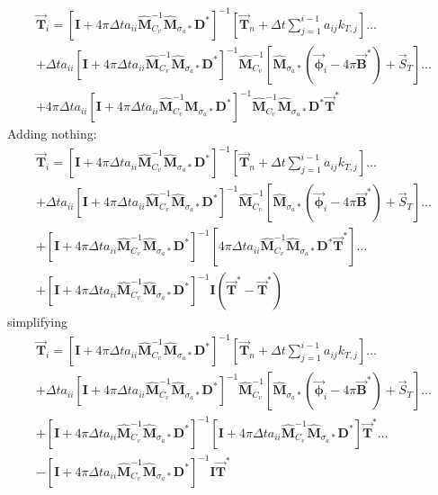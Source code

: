 \documentclass[11pt]{article}
\newcommand{\vect}[1]{\ensuremath{ \vec{\mathbf #1}}}
\newcommand{\Mw}{\ensuremath{\widehat{\mathbf M}}}
\begin{document}
%
%
%
\begin{multline*}
\vect{T}_i = \left[\mathbf{I} +4\pi\Delta t a_{ii}\Mw_{C_v}^{-1}\Mw_{\sigma_a*}\mathbf{D}^*  \right]^{-1}\left[\vect{T}_n + \Delta t \sum_{j=1}^{i-1}{a_{ij} k_{T,j}   }\right] \dots \\
+ \Delta t a_{ii}\left[\mathbf{I} +4\pi\Delta t a_{ii}\Mw_{C_v}^{-1}\Mw_{\sigma_a*}\mathbf{D}^*  \right]^{-1}
\Mw_{C_v}^{-1}\left[ \Mw_{\sigma_a*}\left(\vect{\phi}_i - 4\pi\vect{B}^*\right)  + \vec{S}_T \right]\dots \\
+4\pi\Delta t a_{ii}\left[\mathbf{I} + 4\pi\Delta t a_{ii}\Mw_{C_v}^{-1}\Mw_{\sigma_a*}\mathbf{D}^*  \right]^{-1}
\Mw_{C_v}^{-1}\Mw_{\sigma_a*}\mathbf{D}^*\vect{T}^*
\end{multline*}
%
%
Adding nothing:
\begin{multline*}
\vect{T}_i = \left[\mathbf{I} + 4\pi\Delta t a_{ii}\Mw_{C_v}^{-1}\Mw_{\sigma_a*}\mathbf{D}^*  \right]^{-1}\left[\vect{T}_n + \Delta t \sum_{j=1}^{i-1}{a_{ij} k_{T,j}   }\right] \dots \\
+ \Delta t a_{ii}\left[\mathbf{I} + 4\pi\Delta t a_{ii}\Mw_{C_v}^{-1}\Mw_{\sigma_a*}\mathbf{D}^*  \right]^{-1}
\Mw_{C_v}^{-1}\left[\Mw_{\sigma_a*} \left(\vect{\phi}_i -  4\pi\vect{B}^*\right) + \vec{S}_T \right]\dots \\
+\left[\mathbf{I} + 4\pi\Delta t a_{ii}\Mw_{C_v}^{-1}\Mw_{\sigma_a*}\mathbf{D}^*  \right]^{-1}
\left[ 4\pi\Delta t a_{ii} \Mw_{C_v}^{-1}\Mw_{\sigma_a*}  \mathbf{D}^*\vect{T}^* \right]\dots \\
+ \left[\mathbf{I} + 4\pi\Delta t a_{ii}\Mw_{C_v}^{-1}\Mw_{\sigma_a*}\mathbf{D}^*  \right]^{-1} \mathbf{I}\left( \vect{T}^* - \vect{T}^*\right)
\end{multline*}
%
%
simplifying
\begin{multline*}
\vect{T}_i = \left[\mathbf{I} + 4\pi\Delta t a_{ii}\Mw_{C_v}^{-1}\Mw_{\sigma_a*}\mathbf{D}^*  \right]^{-1}\left[\vect{T}_n + \Delta t \sum_{j=1}^{i-1}{a_{ij} k_{T,j}   }\right] \dots \\
+ \Delta t a_{ii}\left[\mathbf{I} + 4\pi\Delta t a_{ii}\Mw_{C_v}^{-1}\Mw_{\sigma_a*}\mathbf{D}^*  \right]^{-1}
\Mw_{C_v}^{-1}\left[\Mw_{\sigma_a*}\left(\vect{\phi}_i - 4\pi\vect{B}^*\right) + \vec{S}_T \right]\dots \\
+\left[\mathbf{I} + 4\pi\Delta t a_{ii}\Mw_{C_v}^{-1}\Mw_{\sigma_a*}\mathbf{D}^*  \right]^{-1}
\left[ \mathbf{I} + 4\pi\Delta t a_{ii} \Mw_{C_v}^{-1}\Mw_{\sigma_a*} \mathbf{D}^*\right]\vect{T}^* \dots \\
- \left[\mathbf{I} + 4\pi\Delta t a_{ii}\Mw_{C_v}^{-1}\Mw_{\sigma_a*}\mathbf{D}^*  \right]^{-1} \mathbf{I}\vect{T}^* 
\end{multline*}
\end{document}
